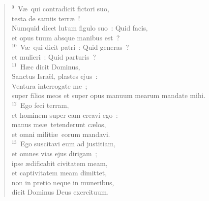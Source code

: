 \begin{verse}${}^{9}$~V\ae\ qui contradicit fictori suo,\\ testa de samiis terr\ae~!\\ Numquid dicet lutum figulo suo~: Quid facis,\\ et opus tuum absque manibus est~?\\
${}^{10}$~V\ae\ qui dicit patri~: Quid generas~?\\ et mulieri~: Quid parturis~?\\
${}^{11}$~H\ae c dicit Dominus,\\ Sanctus Isra\"el, plastes ejus~:\\ Ventura interrogate me~;\\ super filios meos et super opus manuum mearum mandate mihi.\\
${}^{12}$~Ego feci terram,\\ et hominem super eam creavi ego~:\\ manus me\ae\ tetenderunt c\ae los,\\ et omni militi\ae\ eorum mandavi.\\
${}^{13}$~Ego suscitavi eum ad justitiam,\\ et omnes vias ejus dirigam~;\\ ipse \ae dificabit civitatem meam,\\ et captivitatem meam dimittet,\\ non in pretio neque in muneribus,\\ dicit Dominus Deus exercituum.\end{verse}


